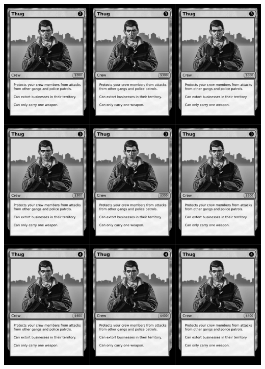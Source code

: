 \documentclass[a4paper]{article}
\begin{document}
\newpage

\begin{center}
	\centering
	\includegraphics[width=200.5mm,height=280.7mm]{output/temp/page17.png}
\end{center}
\end{document}
